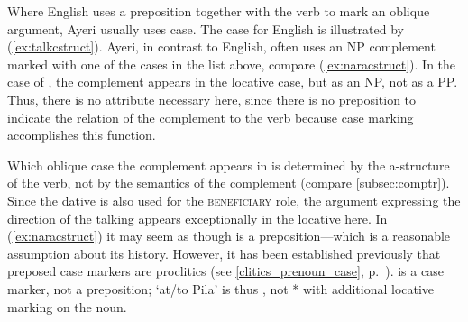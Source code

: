 Where English uses a preposition together with the verb to mark an oblique
argument, Ayeri usually uses case. The case
for English is illustrated by (\ref{ex:talkcstruct}). Ayeri, in contrast to
English, often uses an NP complement marked with one of the cases in the list
above, compare (\ref{ex:naracstruct}). In the case of , the complement appears in the locative case, but as an NP, not as a PP.
Thus, there is no \PCase{} attribute necessary here, since there is no
preposition to indicate the relation of the complement to the verb because case
marking accomplishes this function.

Which oblique case the complement appears in is determined by the a-structure
of the verb, not by the semantics of the complement (compare 
\autoref{subsec:comptr}). Since the dative is also used for the
\textsc{beneficiary} role, the argument expressing the direction of the talking
appears exceptionally in the locative here. In (\ref{ex:naracstruct}) it may
seem as though  is a preposition---which is a reasonable assumption
about its history. However, it has been established previously that preposed
case markers are proclitics (see \autoref{clitics_prenoun_case}, 
p.~\pageref{clitics_prenoun_case}).  is a case marker, not a
preposition; `at/to Pila' is thus , not * with additional locative marking on the noun.

